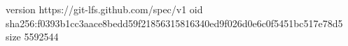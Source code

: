 version https://git-lfs.github.com/spec/v1
oid sha256:f0393b1cc3aace8bedd59f21856315816340ed9f026d0e6c0f5451bc517e78d5
size 5592544
